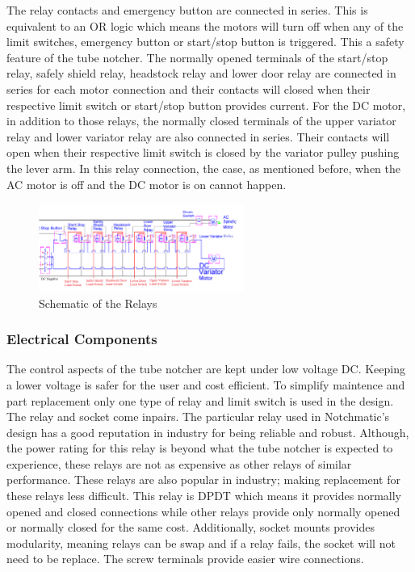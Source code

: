 The relay contacts and emergency button are connected in series. This is equivalent to an OR logic which means the motors will turn off when any of the limit switches, emergency button or start/stop button is triggered. This a safety feature of the tube notcher. 
The normally opened terminals of the start/stop relay, safely shield relay, headstock relay and lower door relay are connected in series for each motor connection and their contacts will closed  when their respective limit switch or start/stop button provides current. 
For the DC motor, in addition to those relays, the normally closed terminals of the upper variator relay and lower variator relay are also connected in series. Their contacts will open when their respective limit switch is closed by the variator pulley pushing the lever arm.
In this relay connection, the case, as mentioned before, when the AC motor is off and the DC motor is on cannot happen. 
\begin{figure}[H]
    \centering
    \includegraphics[width=0.6\textwidth]{./images/Chapter2-MachineDescription/Relays}
    \caption{Schematic of the Relays}
    \label{fig:Electrical:Relays}
\end{figure} 

\subsubsection{Electrical Components}
The control aspects of the tube notcher are kept under low voltage DC. Keeping a lower voltage is safer for the user and cost efficient. To simplify maintence and part replacement only one type of relay and limit switch is used in the design. The relay and socket come inpairs. The particular relay used in Notchmatic's design has a good reputation in industry for being reliable and robust. Although, the power rating for this relay is beyond what the tube notcher is expected to experience, these relays are not as expensive as other relays of similar performance. These relays are also popular in industry; making replacement for these relays less difficult. This relay is DPDT which means it provides normally opened and closed connections while other relays provide only normally opened or normally closed for the same cost. Additionally, socket mounts provides modularity, meaning relays can be swap and if a relay fails, the socket will not need to be replace. The screw terminals provide easier wire connections.

